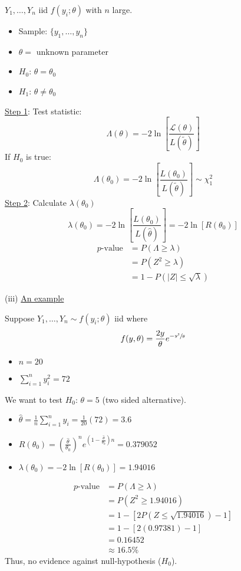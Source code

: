 $ Y_1,\ldots ,Y_n $ iid $ f(y_i;\theta) $ with $ n $ large.
\begin{itemize}
    \item Sample: $ \{y_1,\ldots ,y_n\} $
    \item $ \theta= $ unknown parameter
    \item $ H_0 $: $ \theta=\theta_0 $
    \item $ H_1 $: $ \theta\neq\theta_0 $
\end{itemize}
\underline{Step 1}: Test statistic:
\[ \Lambda(\theta)=-2\ln\left[ \frac{\mathcal{L}(\theta)}{L(\tilde{\theta})}  \right] \]
If $ H_0 $ is true:
\[ \Lambda(\theta_0)=-2\ln\left[ \frac{L(\theta_0)}{L(\tilde{\theta})}  \right]
    \sim \chi^2_{1} \]
\underline{Step 2}: Calculate $ \lambda(\theta_0) $
\[ \lambda(\theta_0)=-2\ln\left[ \frac{L(\theta_0)}{L(\hat{\theta})}  \right]=-2\ln
    \left[ R(\theta_0) \right] \]
\begin{align*}
    p\text{-value}
     & =P(\Lambda\geqslant \lambda)      \\
     & =P(Z^2\geqslant \lambda)          \\
     & =1-P(|Z|\leqslant \sqrt{\lambda})
\end{align*}

(iii) \underline{An example}

\begin{Example}{}{}
    Suppose $ Y_1,\ldots ,Y_n \sim f(y_i;\theta) $ iid where
    \[ f(y,\theta)=\frac{2y}{\theta}e^{-\sfrac{y^2}{\theta}} \]
    \begin{itemize}
        \item $ n=20 $
        \item $ \sum\limits_{i=1}^{n} y_i^2=72 $
    \end{itemize}

    We want to test $ H_0 $: $ \theta=5 $ (two sided alternative).
    \begin{itemize}
        \item $ \hat{\theta}=\frac{1}{n} \sum\limits_{i=1}^{n}y_i=\frac{1}{20}(72)=3.6 $
        \item $ R(\theta_0)=\left( \frac{\hat{\theta}}{\theta_0} \right)^n
                  e^{\left(1-\frac{\hat{\theta}}{\theta_0}\right)n} = 0.379052 $
        \item $ \lambda(\theta_0) =-2\ln \left[ R(\theta_0) \right]=1.94016 $
    \end{itemize}
    \begin{align*}
        p\text{-value}
         & =P(\Lambda\geqslant \lambda)                       \\
         & =P(Z^2\geqslant 1.94016)                           \\
         & =1-\left[ 2 P(Z\leqslant \sqrt{1.94016})-1 \right] \\
         & = 1-\left[ 2(0.97381)-1 \right]                    \\
         & = 0.16452                                          \\
         & \approx 16.5\%
    \end{align*}
    Thus, no evidence against null-hypothesis ($ H_0 $).
\end{Example}

